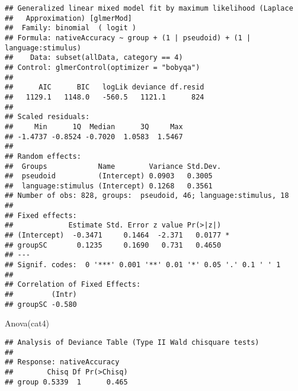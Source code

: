 \documentclass[
]{article}
\newenvironment{Shaded}{\begin{snugshade}}{\end{snugshade}}
\newcommand{\AttributeTok}[1]{\textcolor[rgb]{0.77,0.63,0.00}{#1}}
\newcommand{\DecValTok}[1]{\textcolor[rgb]{0.00,0.00,0.81}{#1}}
\newcommand{\FunctionTok}[1]{\textcolor[rgb]{0.00,0.00,0.00}{#1}}
\newcommand{\NormalTok}[1]{#1}
\newcommand{\OtherTok}[1]{\textcolor[rgb]{0.56,0.35,0.01}{#1}}
\newcommand{\SpecialCharTok}[1]{\textcolor[rgb]{0.00,0.00,0.00}{#1}}
\newcommand{\StringTok}[1]{\textcolor[rgb]{0.31,0.60,0.02}{#1}}
\begin{document}
\begin{verbatim}
## Generalized linear mixed model fit by maximum likelihood (Laplace
##   Approximation) [glmerMod]
##  Family: binomial  ( logit )
## Formula: nativeAccuracy ~ group + (1 | pseudoid) + (1 | language:stimulus)
##    Data: subset(allData, category == 4)
## Control: glmerControl(optimizer = "bobyqa")
## 
##      AIC      BIC   logLik deviance df.resid 
##   1129.1   1148.0   -560.5   1121.1      824 
## 
## Scaled residuals: 
##     Min      1Q  Median      3Q     Max 
## -1.4737 -0.8524 -0.7020  1.0583  1.5467 
## 
## Random effects:
##  Groups            Name        Variance Std.Dev.
##  pseudoid          (Intercept) 0.0903   0.3005  
##  language:stimulus (Intercept) 0.1268   0.3561  
## Number of obs: 828, groups:  pseudoid, 46; language:stimulus, 18
## 
## Fixed effects:
##             Estimate Std. Error z value Pr(>|z|)  
## (Intercept)  -0.3471     0.1464  -2.371   0.0177 *
## groupSC       0.1235     0.1690   0.731   0.4650  
## ---
## Signif. codes:  0 '***' 0.001 '**' 0.01 '*' 0.05 '.' 0.1 ' ' 1
## 
## Correlation of Fixed Effects:
##         (Intr)
## groupSC -0.580
\end{verbatim}

\begin{Shaded}
\begin{Highlighting}[]
\FunctionTok{Anova}\NormalTok{(cat4)}
\end{Highlighting}
\end{Shaded}

\begin{verbatim}
## Analysis of Deviance Table (Type II Wald chisquare tests)
## 
## Response: nativeAccuracy
##        Chisq Df Pr(>Chisq)
## group 0.5339  1      0.465
\end{verbatim}

\begin{Shaded}
\end{Shaded}
\end{document}
